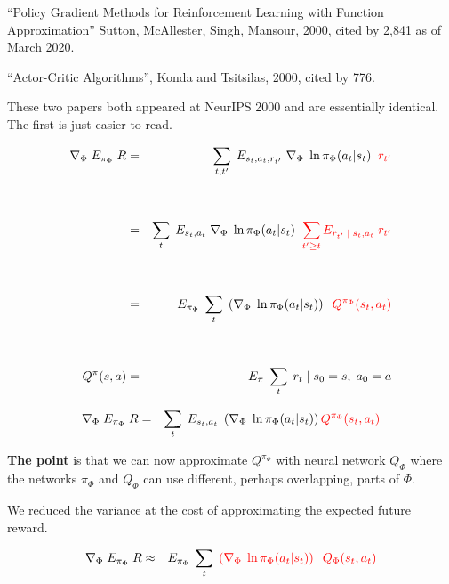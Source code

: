 {

``Policy Gradient Methods for
Reinforcement Learning with Function
Approximation'' Sutton, McAllester, Singh, Mansour, 2000, cited by 2,841 as of March 2020.

\vfill
``Actor-Critic Algorithms'', Konda and Tsitsilas, 2000, cited by 776.

\vfill
These two papers both appeared at NeurIPS 2000 and are essentially identical.  The first is just easier to read.



\begin{eqnarray*}
    \nabla_\Phi \; E_{\pi_\Phi}\; R  & = & \sum_{t,t'}\;E_{s_t,a_t,r_{t'}}\;\nabla_\Phi\; \ln \pi_\Phi(a_{t}|s_{t})\;\;{\color{red} r_{t'}} \\
    \\
    \\
    & = & \sum_{t}\;E_{s_t,a_t}\;\nabla_\Phi\; \ln \pi_\Phi(a_{t}|s_{t})\;\;{\color{red} \sum_{t' \geq t} E_{r_{t'}\;|\;s_t,a_t}\;r_{t'}} \\
  \\
  \\
  & = & E_{\pi_\Phi} \; \sum_t\; \left(\nabla_\Phi \;\ln \pi_\Phi(a_t|s_t)\right) \;\;{\color{red} Q^{\pi_\Phi}(s_t,a_t)} \\
  \\
  \\
 Q^\pi(s,a) & = & E_{\pi}\;\sum_t\; r_t\;|\;s_0=s,\;a_0=a
 \end{eqnarray*}

\begin{eqnarray*}
  \nabla_\Phi \;E_{\pi_\Phi}\;R   & = & \sum_t\;E_{s_t,a_t}\; \left(\nabla_\Phi \;\ln \pi_\Phi(a_t|s_t)\right) {\color{red} Q^{\pi_\Phi}(s_t,a_t)}
\end{eqnarray*}

\vfill
{\bf The point} is that we can now approximate $Q^{\pi_\Phi}$ with neural network $Q_\Phi$ where the networks $\pi_\Phi$ and $Q_\Phi$ can use different, perhaps overlapping, parts of $\Phi$.

\vfill
We reduced the variance at the cost of approximating the expected future reward.


\begin{eqnarray*}
  \nabla_\Phi \;E_{\pi_\Phi}\;R   & \approx & E_{\pi_\Phi} \; \sum_t\; {\color{red} \left(\nabla_\Phi \;\ln \pi_\Phi(a_t|s_t)\right) \;\;Q_\Phi(s_t,a_t)}
\end{eqnarray*}

}
